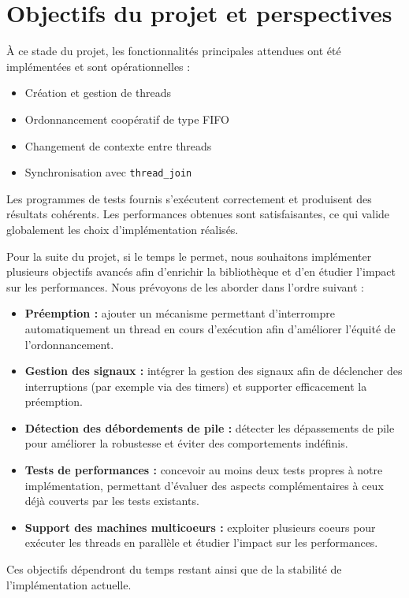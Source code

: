 \section{Objectifs du projet et perspectives}

À ce stade du projet, les fonctionnalités principales attendues ont été
implémentées et sont opérationnelles :
\begin{itemize}
    \item Création et gestion de threads
    \item Ordonnancement coopératif de type FIFO
    \item Changement de contexte entre threads
    \item Synchronisation avec \texttt{thread\_join}
\end{itemize}

Les programmes de tests fournis s'exécutent correctement et produisent des
résultats cohérents. Les performances obtenues sont satisfaisantes, ce qui
valide globalement les choix d'implémentation réalisés.

\vspace{0.5cm}

Pour la suite du projet, si le temps le permet, nous souhaitons implémenter
plusieurs objectifs avancés afin d'enrichir la bibliothèque et d'en étudier
l'impact sur les performances. Nous prévoyons de les aborder dans l'ordre
suivant :

\begin{itemize}
    \item \textbf{Préemption :} ajouter un mécanisme permettant d'interrompre
    automatiquement un thread en cours d'exécution afin d'améliorer l'équité
    de l'ordonnancement.

    \item \textbf{Gestion des signaux :} intégrer la gestion des signaux afin
    de déclencher des interruptions (par exemple via des timers) et supporter
    efficacement la préemption.

    \item \textbf{Détection des débordements de pile :} détecter les
    dépassements de pile pour améliorer la robustesse et éviter des
    comportements indéfinis.

    \item \textbf{Tests de performances :} concevoir au moins deux tests
    propres à notre implémentation, permettant d'évaluer des aspects
    complémentaires à ceux déjà couverts par les tests existants.

    \item \textbf{Support des machines multicoeurs :} exploiter plusieurs
    coeurs pour exécuter les threads en parallèle et étudier l'impact sur
    les performances.
\end{itemize}

Ces objectifs dépendront du temps restant ainsi que de la stabilité de
l'implémentation actuelle.
